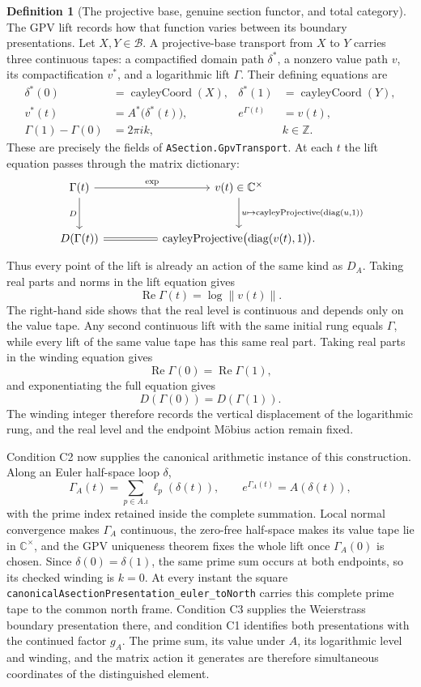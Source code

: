 \documentclass[11pt]{article}
\newcommand{\CC}{\mathbb{C}}
\newcommand{\ZZ}{\mathbb{Z}}
\theoremstyle{plain}
\theoremstyle{definition}
\newtheorem{definition}[theorem]{Definition}
\theoremstyle{remark}
\begin{document}
\begin{definition}[The projective base, genuine section functor, and total category]
The GPV lift records how that function varies between its boundary presentations. Let
$X,Y\in\mathcal B$. A projective-base transport from $X$ to $Y$ carries three continuous tapes:
a compactified domain path $\delta^*$, a nonzero value path $v$, its compactification $v^*$,
and a logarithmic lift $\Gamma$.
Their defining equations are
\[
\begin{aligned}
 \delta^*(0)&=\operatorname{cayleyCoord}(X),
 &\delta^*(1)&=\operatorname{cayleyCoord}(Y),\\
 v^*(t)&=A^*\bigl(\delta^*(t)\bigr),
 &e^{\Gamma(t)}&=v(t),\\
 \Gamma(1)-\Gamma(0)&=2\pi i k,
 &&k\in\ZZ.
\end{aligned}
\]
These are precisely the fields of \texttt{ASection.GpvTransport}. At each $t$ the lift equation
passes through the matrix dictionary:
\[
\begin{tikzcd}[column sep=huge,row sep=large]
\Gamma(t) \arrow[r,"\exp"] \arrow[d,"D"'] &
v(t)\in\CC^\times
  \arrow[d,"{u\mapsto\operatorname{cayleyProjective}(\operatorname{diag}(u,1))}"]\\
D(\Gamma(t)) \arrow[r,equal] &
\operatorname{cayleyProjective}\bigl(\operatorname{diag}(v(t),1)\bigr).
\end{tikzcd}
\]
Thus every point of the lift is already an action of the same kind as $D_A$. Taking real parts
and norms in the lift equation gives
\[
  \operatorname{Re}\Gamma(t)=\log\lVert v(t)\rVert.
\]
The right-hand side shows that the real level is continuous and depends only on the value tape.
Any second continuous lift with the same initial rung equals $\Gamma$, while every lift of the
same value tape has this same real part. Taking real parts in the winding equation gives
\[
  \operatorname{Re}\Gamma(0)=\operatorname{Re}\Gamma(1),
\]
and exponentiating the full equation gives
\[
  D(\Gamma(0))=D(\Gamma(1)).
\]
The winding integer therefore records the vertical displacement of the logarithmic rung, and the
real level and the endpoint M\"obius action remain fixed.

Condition \textup{C2} now supplies the canonical arithmetic instance of this construction. Along
an Euler half-space loop $\delta$,
\[
  \Gamma_A(t)=\sum_{p\in A.\iota}\ell_p(\delta(t)),
  \qquad e^{\Gamma_A(t)}=A(\delta(t)),
\]
with the prime index retained inside the complete summation. Local normal convergence makes
$\Gamma_A$ continuous, the zero-free half-space makes its value tape lie in $\CC^\times$, and the
GPV uniqueness theorem fixes the whole lift once $\Gamma_A(0)$ is chosen. Since $\delta(0)=
\delta(1)$, the same prime sum occurs at both endpoints, so its checked winding is $k=0$. At every
instant the square \texttt{canonicalAsectionPresentation\_euler\_toNorth} carries this complete
prime tape to the common north frame. Condition \textup{C3} supplies the Weierstrass boundary
presentation there, and condition \textup{C1} identifies both presentations with the continued
factor $g_A$. The prime sum, its value under $A$, its logarithmic level and winding, and the matrix
action it generates are therefore simultaneous coordinates of the distinguished element.


\end{definition}
\end{document}
